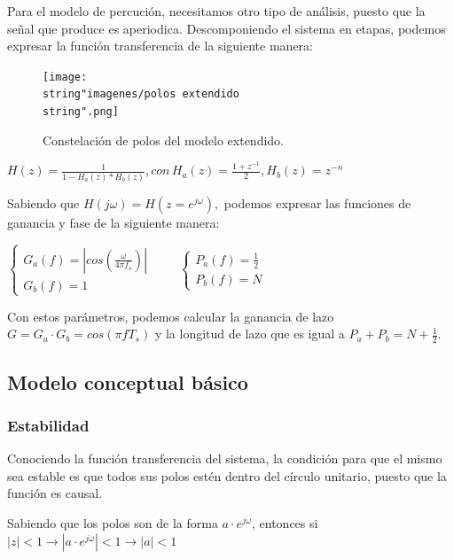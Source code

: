 \documentclass[../ASSD_TP2.tex]{subfiles}
\begin{document}
Para el modelo de percución, necesitamos otro tipo de análisis, puesto
que la señal que produce es aperiodica. Descomponiendo el sistema
en etapas, podemos expresar la función transferencia de la siguiente
manera:

\begin{figure}%
\centering{}\texttt{[image: \\string"imagenes/polos extendido\\string".png]}\caption{Constelación de polos del modelo extendido.}
\end{figure}%

\begin{center}
$H(z)=\frac{1}{1-H_{a}(z)*H_{b}(z)},con\,H_{a}(z)=\frac{1+z^{-1}}{2},H_{b}(z)=z^{-n}$
\par\end{center}

Sabiendo que $H(j\omega)=H(z=e^{j\omega}),$ podemos expresar las
funciones de ganancia y fase de la siguiente manera:
\begin{center}
$\begin{cases}
G_{a}(f)=|cos(\frac{\omega}{4\pi f_{s}})|\\
G_{b}(f)=1
\end{cases}$ ~~~ $\begin{cases}
P_{a}(f)=\frac{1}{2}\\
P_{b}(f)=N
\end{cases}$
\par\end{center}

Con estos parámetros, podemos calcular la ganancia de lazo $G=G_{a}\cdot G_{b}=cos(\pi fT_{s})$
y la longitud de lazo que es igual a $P_{a}+P_{b}=N+\frac{1}{2}$.

\subsection{Modelo conceptual básico}

\subsubsection{Estabilidad}

Conociendo la función transferencia del sistema, la condición para
que el mismo sea estable es que todos sus polos estén dentro del círculo
unitario, puesto que la función es causal.

Sabiendo que los polos son de la forma $a\cdot e^{j\omega}$, entonces
si $|z|<1\rightarrow|a\cdot e^{j\omega}|<1\rightarrow|a|<1$
\end{document}
